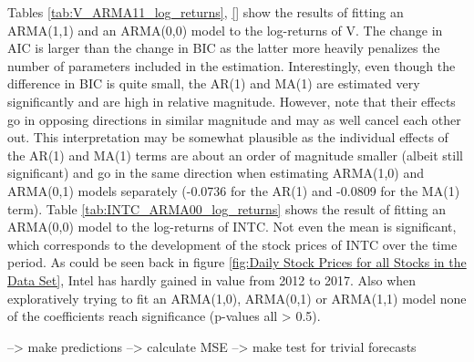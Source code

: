 Tables \ref{tab:V_ARMA11_log_returns}, \ref{} show the results of fitting an  ARMA(1,1) and an ARMA(0,0) model to the log-returns of V. The change in AIC is larger than the change in BIC as the latter more heavily penalizes the number of parameters included in the estimation. Interestingly, even though the difference in BIC is quite small, the AR(1) and MA(1) are estimated very significantly and are high in relative magnitude. However, note that their effects go in opposing directions in similar magnitude and may as well cancel each other out. This interpretation may be somewhat plausible as the individual effects of the AR(1) and MA(1) terms are about an order of magnitude smaller (albeit still significant) and go in the same direction when estimating ARMA(1,0) and ARMA(0,1) models separately (-0.0736 for the AR(1) and -0.0809 for the MA(1) term).
Table \ref{tab:INTC_ARMA00_log_returns} shows the result of fitting an ARMA(0,0) model to the log-returns of INTC. Not even the mean is significant, which corresponds to the development of the stock prices of INTC over the time period. As could be seen back in figure \ref{fig:Daily Stock Prices for all Stocks in the Data Set}, Intel has hardly gained in value from 2012 to 2017. Also when exploratively trying to fit an ARMA(1,0), ARMA(0,1) or ARMA(1,1) model none of the coefficients reach significance (p-values all > 0.5). 

\begin{table}[h]
    \centering
    
    \caption{}
    \label{tab:V_ARMA11_log_returns}
\end{table}{}

\begin{table}[h!]
    \centering
    
    \caption{}
    \label{tab:V_ARMA11_log_returns}
\end{table}{}

\begin{table}[h!]
    \centering
    
    \caption{}
    \label{tab:INTC_ARMA00_log_returns}
\end{table}{}


--> make predictions
--> calculate MSE
--> make test for trivial forecasts

